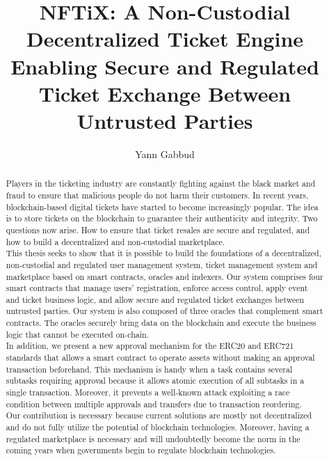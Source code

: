 \documentclass[a4paper,11pt,oneside]{report}
\title{NFTiX: A Non-Custodial Decentralized Ticket Engine Enabling Secure and Regulated Ticket Exchange Between Untrusted Parties}
\author{Yann Gabbud}
\affiliation{Distributed Computing Laboratory \\
and \\
Secutix SA, an ELCA company \\}
\begin{document}
\maketitle
\makeacks

\begin{abstract}
Players in the ticketing industry are constantly fighting against the black market and fraud to ensure that malicious people do not harm their customers. In recent years, blockchain-based digital tickets have started to become increasingly popular. The idea is to store tickets on the blockchain to guarantee their authenticity and integrity. Two questions now arise. How to ensure that ticket resales are secure and regulated, and how to build a decentralized and non-custodial marketplace. \\

This thesis seeks to show that it is possible to build the foundations of a decentralized, non-custodial and regulated user management system, ticket management system and marketplace based on smart contracts, oracles and indexers. Our system comprises four smart contracts that manage users' registration, enforce access control, apply event and ticket business logic, and allow secure and regulated ticket exchanges between untrusted parties. Our system is also composed of three oracles that complement smart contracts. The oracles securely bring data on the blockchain and execute the business logic that cannot be executed on-chain. \\

In addition, we present a new approval mechanism for the ERC20 and ERC721 standards that allows a smart contract to operate assets without making an approval transaction beforehand. This mechanism is handy when a task contains several subtasks requiring approval because it allows atomic execution of all subtasks in a single transaction. Moreover, it prevents a well-known attack exploiting a race condition between multiple approvals and transfers due to transaction reordering. \\

Our contribution is necessary because current solutions are mostly not decentralized and do not fully utilize the potential of blockchain technologies. Moreover, having a regulated marketplace is necessary and will undoubtedly become the norm in the coming years when governments begin to regulate blockchain technologies. \\
\end{abstract}
\end{document}
